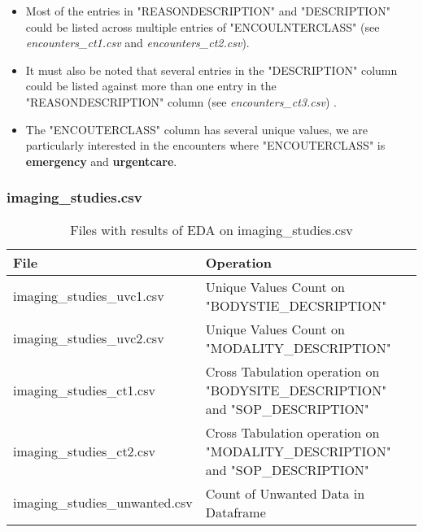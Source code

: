 \documentclass[12pt, twosided]{report}  %
\begin{document}
\begin{itemize}
	\item Most of the entries in "REASONDESCRIPTION" and "DESCRIPTION" could be listed across multiple entries of "ENCOULNTERCLASS" (see \textit{encounters\_ct1.csv} and \textit{encounters\_ct2.csv}).
	
	\item It must also be noted that several entries in the "DESCRIPTION" column could be listed against more than one entry in the "REASONDESCRIPTION" column (see \textit{encounters\_ct3.csv}) .
	
	\item The "ENCOUTERCLASS" column has several unique values, we are particularly interested in the encounters where "ENCOUTERCLASS" is \textbf{emergency} and \textbf{urgentcare}.

\end{itemize}


\subsubsection{imaging\_studies.csv}

\begin{table}[H]
	\centering
	\begin{tabular}{p{5.5cm}|p{14cm}}
		\textbf{File}                  & \textbf{Operation} \\ \hline
		imaging\_studies\_uvc1.csv     & Unique Values Count on "BODYSTIE\_DECSRIPTION" \\
		imaging\_studies\_uvc2.csv     & Unique Values Count on "MODALITY\_DESCRIPTION" \\
		imaging\_studies\_ct1.csv      & Cross Tabulation operation on "BODYSITE\_DESCRIPTION" and "SOP\_DESCRIPTION" \\
		imaging\_studies\_ct2.csv      & Cross Tabulation operation on "MODALITY\_DESCRIPTION" and "SOP\_DESCRIPTION" \\
		imaging\_studies\_unwanted.csv & Count of Unwanted Data in Dataframe
	\end{tabular}
	\caption{Files with results of EDA on imaging\_studies.csv}
\end{table}
\end{document}
